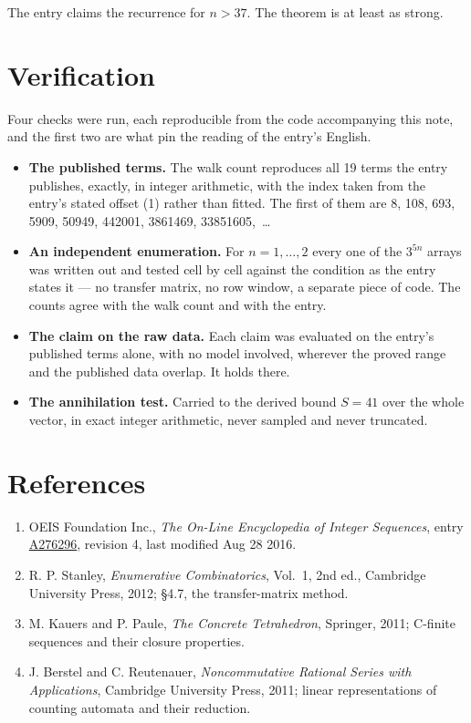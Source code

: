 \documentclass[11pt]{article}
\theoremstyle{definition}
\begin{document}
The entry claims the recurrence for $n > 37$. The theorem is at least as strong.

\section{Verification}

Four checks were run, each reproducible from the code accompanying this note, and the first two are what pin the reading of the entry's English.

\begin{itemize}

\item {\bfseries The published terms.} The walk count reproduces all 19 terms the entry publishes, exactly, in integer arithmetic, with the index taken from the entry's stated offset (1) rather than fitted. The first of them are 8, 108, 693, 5909, 50949, 442001, 3861469, 33851605,~\dots

\item {\bfseries An independent enumeration.} For $n = 1,\dots,2$ every one of the $3^{5n}$ arrays was written out and tested cell by cell against the condition as the entry states it --- no transfer matrix, no row window, a separate piece of code. The counts agree with the walk count and with the entry.

\item {\bfseries The claim on the raw data.} Each claim was evaluated on the entry's published terms alone, with no model involved, wherever the proved range and the published data overlap. It holds there.

\item {\bfseries The annihilation test.} Carried to the derived bound $S = 41$ over the whole vector, in exact integer arithmetic, never sampled and never truncated.

\end{itemize}

\section{References}

\begin{enumerate}

\item OEIS Foundation Inc., \emph{The On-Line Encyclopedia of Integer Sequences}, entry \href{https://oeis.org/A276296}{A276296}, revision 4, last modified Aug 28 2016.

\item R. P. Stanley, \emph{Enumerative Combinatorics}, Vol.~1, 2nd ed., Cambridge University Press, 2012; \S4.7, the transfer-matrix method.

\item M. Kauers and P. Paule, \emph{The Concrete Tetrahedron}, Springer, 2011; C-finite sequences and their closure properties.

\item J. Berstel and C. Reutenauer, \emph{Noncommutative Rational Series with Applications}, Cambridge University Press, 2011; linear representations of counting automata and their reduction.

\end{enumerate}
\end{document}
